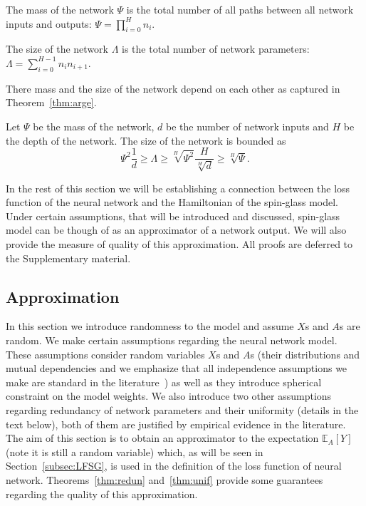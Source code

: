 \documentclass[twoside]{article}
\begin{document}
\begin{definition}
The mass of the network $\Psi$ is the total number of all paths between all network inputs and outputs: $\Psi = \prod_{i=0}^Hn_i$.
\end{definition}

\begin{definition}
The size of the network $\Lambda$ is the total number of network parameters: $\Lambda = \sum_{i=0}^{H-1}n_in_{i+1}$.
\end{definition}

There mass and the size of the network depend on each other as captured in Theorem~\ref{thm:arge}.
\begin{theorem}
Let $\Psi$ be the mass of the network, $d$ be the number of network inputs and $H$ be the depth of the network. The size of the network is bounded as
\[\Psi^2\frac{1}{d} \geq \Lambda \geq \sqrt[H]{\Psi^2}\frac{H}{\sqrt[H]{d}} \geq \sqrt[H]{\Psi}.
\]
\label{thm:arge}
\end{theorem}

In the rest of this section we will be establishing a connection between the loss function of the neural network and the Hamiltonian of the spin-glass model. Under certain assumptions, that will be introduced and discussed, spin-glass model can be though of as an approximator of a network output. We will also provide the measure of quality of this approximation. All proofs are deferred to the Supplementary material.

\subsection{Approximation}

In this section we introduce randomness to the model and assume $X$s and $A$s are random. We make certain assumptions regarding the neural network model. These assumptions consider random variables $X$s and $A$s (their distributions and mutual dependencies and we emphasize that all independence assumptions we make are standard in the literature~\cite{opac-b1095246}) as well as they introduce spherical constraint on the model weights. We also introduce two other assumptions regarding redundancy of network parameters and their uniformity (details in the text below), both of them are justified by empirical evidence in the literature. The aim of this section is to obtain an approximator to the expectation $\mathbb{E}_A[Y]$ (note it is still a random variable) which, as will be seen in Section~\ref{subsec:LFSG}, is used in the definition of the loss function of neural network. Theorems~\ref{thm:redun} and~\ref{thm:unif} provide some guarantees regarding the quality of this approximation.  
\end{document}
